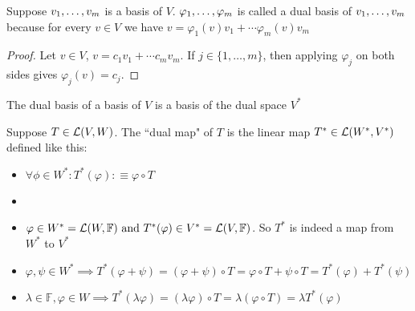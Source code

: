 \setcounter{thm}{113}
\begin{thm}
    Suppose $v_1, \dots, v_m$ is a basis of $V$. $\varphi_1, \dots, \varphi_m$ is called a dual basis of $v_1, \dots, v_m$ because for every $v \in V$ we have $v=\varphi_1 (v)v_1 + \cdots \varphi_m(v)v_m$
\end{thm}
\begin{proof}
    Let $v\in V$, $v= c_1v_1 + \cdots c_mv_m$. If $j\in \{1, \dots, m\}$, then applying
    $\varphi_j$ on both sides gives $\varphi_j(v)=c_j$.
\end{proof}

\setcounter{thm}{115}
\begin{thm}
    The dual basis of a basis of $V$ is a basis of the dual space $V^{*}$
\end{thm}

\setcounter{thm}{117}
\begin{mydef}
    Suppose $T \in {\mathcal{L}(V,W)}$. The ``dual map" of $T$ is the linear map $T^{*} \in {\mathcal{L}(W^{*}, V^{*})}$ defined like this:

    \begin{itemize}
    \item[] $\forall \phi \in W^{*}: T^{*}(\varphi) :\equiv \varphi \circ T $

    \item[]

    \item $\varphi \in W^{*}={\mathcal{L}(W, \mathbb{F})} \text{ and } T^{*}(\varphi) \in V^{*} = {\mathcal{L}(V, \mathbb{F})}$.
    So $T^{*}$ is indeed a map from $W^{*}$ to $V^{*}$


    	\item $\varphi, \psi \in W^{*} \implies T^{*} (\varphi + \psi) = (\varphi + \psi) \circ T = \varphi \circ T + \psi \circ T = T^{*} (\varphi) + T^{*} (\psi)$
    	\item $\lambda \in \mathbb{F}, \varphi \in W \implies T^{*} (\lambda \varphi) = (\lambda \varphi) \circ T = \lambda (\varphi \circ T) = \lambda T^{*} (\varphi)$
    \end{itemize}
\end{mydef}


